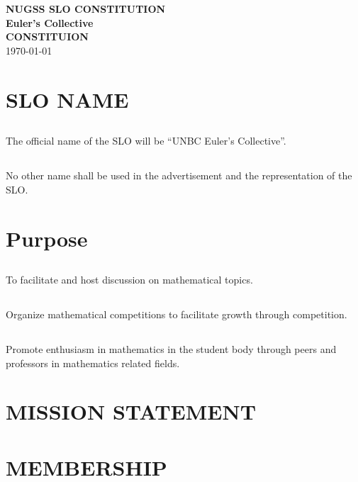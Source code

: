 \documentclass{article}
\def\SLOname{Euler's Collective}
\def\title{\textbf{NUGSS SLO CONSTITUTION}\\ \textbf{\SLOname}\\\textbf{CONSTITUION}\\\today}
\begin{document}
{
	\large
	\begin{center}
\title
\end{center}
}

\section{SLO NAME}
\subsection{}
The official name of the SLO will be \enquote{UNBC \SLOname}.

\subsection{}
No other name shall be used in the advertisement and the representation of the SLO.

\section{Purpose}
\subsection{}
To facilitate and host discussion on mathematical topics.
\subsection{}
Organize mathematical competitions to facilitate growth through competition.
\subsection{}
Promote enthusiasm in mathematics in the student body through peers and professors in mathematics related fields.
\section{MISSION STATEMENT}
\subsection{}
\section{MEMBERSHIP}
\subsection{}
\subsection{}
\end{document}
